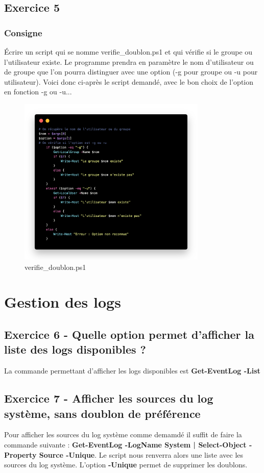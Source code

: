 \documentclass[12pt, a4paper]{article}
\begin{document}
\subsection{Exercice 5}
\subsubsection*{Consigne}

Écrire un script qui se nomme verifie\_doublon.ps1 et qui vérifie si le 
groupe ou l’utilisateur existe. Le programme prendra en paramètre le nom 
d’utilisateur ou de groupe que l’on pourra distinguer avec une option 
(-g pour groupe ou -u pour utilisateur). Voici donc ci-après le script demandé,
avec le bon choix de l'option en fonction -g ou -u... 

\begin{figure}[h]
    \centering
    \includegraphics[width=0.8\textwidth]{img/code2.png}
    \caption{verifie\_doublon.ps1}
    \label{fig:script2}
\end{figure}

\newpage
\section{Gestion des logs}
\subsection{Exercice 6 - Quelle option permet d’afficher la liste des logs disponibles ?}
La commande permettant d'afficher les logs disponibles est \textbf{Get-EventLog -List}

\subsection{Exercice 7 - Afficher les sources du log système, sans doublon de préférence}
Pour afficher les sources du log système comme demamdé il suffit de faire la
commande suivante : \textbf{Get-EventLog -LogName System | Select-Object -Property Source -Unique}.
Le script nous renverra alors une liste avec les sources du log système. L'option 
\textbf{-Unique} permet de supprimer les doublons.\\
\end{document}
